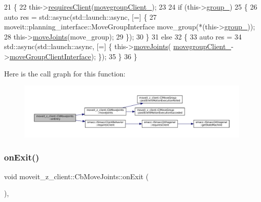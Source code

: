 \begin{DoxyCode}
21   \{
22     this->\hyperlink{classsmacc_1_1ISmaccClientBehavior_a32b16e99e3b4cb289414203dc861a440}{requiresClient}(\hyperlink{classmoveit__z__client_1_1CbMoveJoints_a2ce2e613b676025766dcd2f01ae50810}{movegroupClient\_});
23 
24     \textcolor{keywordflow}{if} (this->\hyperlink{classmoveit__z__client_1_1CbMoveJoints_ac75cb07d2292b2080266c36e4d18fc41}{group\_})
25     \{
26       \textcolor{keyword}{auto} res = std::async(std::launch::async, [=] \{
27         moveit::planning\_interface::MoveGroupInterface move\_group(*(this->\hyperlink{classmoveit__z__client_1_1CbMoveJoints_ac75cb07d2292b2080266c36e4d18fc41}{group\_}));
28         this->\hyperlink{classmoveit__z__client_1_1CbMoveJoints_a4dcc7bcf0ed857d9d580d4700cdeb5db}{moveJoints}(move\_group);
29       \});
30     \}
31     \textcolor{keywordflow}{else}
32     \{
33       \textcolor{keyword}{auto} res =
34           std::async(std::launch::async, [=] \{ this->\hyperlink{classmoveit__z__client_1_1CbMoveJoints_a4dcc7bcf0ed857d9d580d4700cdeb5db}{moveJoints}(
      \hyperlink{classmoveit__z__client_1_1CbMoveJoints_a2ce2e613b676025766dcd2f01ae50810}{movegroupClient\_}->\hyperlink{classmoveit__z__client_1_1ClMoveGroup_af86e046b837be0ef4afa9893d8808f20}{moveGroupClientInterface}); \});
35     \}
36   \}
\end{DoxyCode}
Here is the call graph for this function\+:
\nopagebreak
\begin{figure}[H]
\begin{center}
\leavevmode
\includegraphics[width=350pt]{classmoveit__z__client_1_1CbMoveJoints_a512e97e94ab05ee12837433e5d921095_cgraph}
\end{center}
\end{figure}
\mbox{\label{classmoveit__z__client_1_1CbMoveJoints_a104abb9c8f8ebb04a6e5c8e84b473add}} 
\subsubsection{\texorpdfstring{on\+Exit()}{onExit()}}
{\footnotesize\ttfamily void moveit\+\_\+z\+\_\+client\+::\+Cb\+Move\+Joints\+::on\+Exit (\begin{DoxyParamCaption}{ }\end{DoxyParamCaption})\hspace{0.3cm}{\ttfamily [override]}, {\ttfamily [virtual]}}



